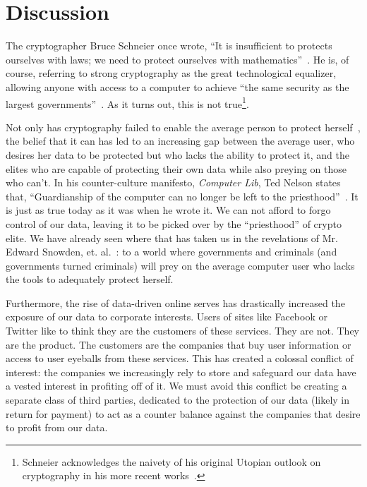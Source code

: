 \section{Discussion}

The cryptographer Bruce Schneier once wrote, ``It is insufficient to
protects ourselves with laws; we need to protect ourselves with
mathematics''~\cite{schneier1996applied}. He is, of course, referring
to strong cryptography as the great technological equalizer, allowing
anyone with access to a computer to achieve ``the same security as the
largest governments''~\cite{schneier2000secrets}. As it turns out,
this is not true\footnote{Schneier acknowledges the naivety of his
  original Utopian outlook on cryptography in his more recent
  works~\cite{schneier2000secrets}.}.

Not only has cryptography failed to enable the average person to
protect herself~\cite{green-challenge}, the belief that it can has led
to an increasing gap between the average user, who desires her data to
be protected but who lacks the ability to protect it, and the elites
who are capable of protecting their own data while also preying on
those who can't. In his counter-culture manifesto, \textit{Computer
  Lib}, Ted Nelson states that, ``Guardianship of the computer can no
longer be left to the priesthood''~\cite{nelson1972computer}. It is
just as true today as it was when he wrote it. We can not afford to
forgo control of our data, leaving it to be picked over by the
``priesthood'' of crypto elite. We have already seen where that has
taken us in the revelations of Mr. Edward Snowden,
et. al.~\cite{GreenwaldPrism}: to a world where governments and
criminals (and governments turned criminals) will prey on the average
computer user who lacks the tools to adequately protect herself.

Furthermore, the rise of data-driven online serves has drastically
increased the exposure of our data to corporate interests. Users of
sites like Facebook or Twitter like to think they are the customers of
these services. They are not. They are the product. The customers are
the companies that buy user information or access to user eyeballs
from these services. This has created a colossal conflict of interest:
the companies we increasingly rely to store and safeguard our data
have a vested interest in profiting off of it. We must avoid this
conflict be creating a separate class of third parties, dedicated to
the protection of our data (likely in return for payment) to act as a
counter balance against the companies that desire to profit from our
data.

